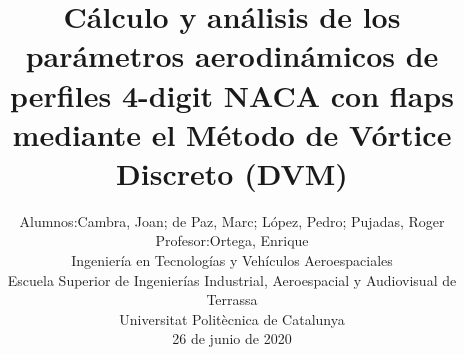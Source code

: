 \documentclass[journal, a4paper, 10pt]{IEEEtran}
\begin{document}
\title{\LARGE{Cálculo y análisis de los parámetros aerodinámicos de perfiles 4-digit NACA con flaps mediante el Método de Vórtice Discreto (DVM)}}
\author{
\begin{tabular}{rl}
     Alumnos: & Cambra, Joan; de Paz, Marc; López, Pedro; Pujadas, Roger \\
     Profesor: & Ortega, Enrique 
\end{tabular}

\begin{tabular}{c}
     Ingeniería en Tecnologías y Vehículos Aeroespaciales \\
    Escuela Superior de Ingenierías Industrial, Aeroespacial y Audiovisual de Terrassa \\
    Universitat Politècnica de Catalunya \\
\end{tabular}

26 de junio de 2020
}
\maketitle





\printbibliography[title={Referencias}]

\clearpage
\onecolumn

\end{document}

